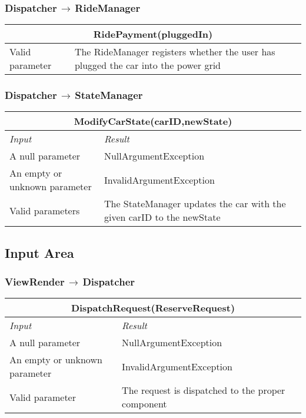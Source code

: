 \documentclass[11pt,a4paper]{report}
\begin{document}
\subsubsection{Dispatcher$\,\to\,$RideManager}
\begin{tabularx}{\textwidth}{|X|X|}
	\hline
	\multicolumn{2}{|c|}{\textbf{RidePayment(pluggedIn)}}\\
	\hline
	Valid parameter & The RideManager registers whether the user has plugged the car into the power grid\\
	\hline
\end{tabularx}
\subsubsection{Dispatcher$\,\to\,$StateManager}
\begin{tabularx}{\textwidth}{|X|X|}
	\hline
	\multicolumn{2}{|c|}{\textbf{ModifyCarState(carID,newState)}}\\
	\hline
	\textit{Input} & \textit{Result}\\
	\hline
	A null parameter & NullArgumentException\\
	\hline
	An empty or unknown parameter & InvalidArgumentException\\
	\hline
	Valid parameters & The StateManager updates the car with the given carID to the newState\\
	\hline
\end{tabularx}
\subsection{Input Area}
\subsubsection{ViewRender$\,\to\,$Dispatcher}
\begin{tabularx}{\textwidth}{|X|X|}
	\hline
	\multicolumn{2}{|c|}{\textbf{DispatchRequest(ReserveRequest)}}\\
	\hline
	\textit{Input} & \textit{Result}\\
	\hline
	A null parameter & NullArgumentException\\
	\hline
	An empty or unknown parameter & InvalidArgumentException\\
	\hline
	Valid parameter & The request is dispatched to the proper component\\
	\hline
\end{tabularx}
\end{document}
